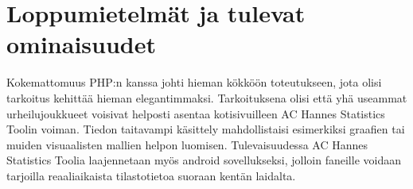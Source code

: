 \documentclass[12pt]{article} %
\begin{document}








\section{Loppumietelmät ja tulevat ominaisuudet} %
Kokemattomuus PHP:n kanssa johti hieman kökköön toteutukseen, jota olisi tarkoitus kehittää hieman elegantimmaksi. Tarkoituksena olisi että yhä useammat urheilujoukkueet voisivat helposti asentaa kotisivuilleen AC Hannes Statistics Toolin voiman. Tiedon taitavampi käsittely mahdollistaisi esimerkiksi graafien tai muiden visuaalisten mallien helpon luomisen. Tulevaisuudessa AC Hannes Statistics Toolia laajennetaan myös android sovellukseksi, jolloin faneille voidaan tarjoilla reaaliaikaista tilastotietoa suoraan kentän laidalta.


\begin{thebibliography}{99} %
\end{thebibliography}

\end{document}
